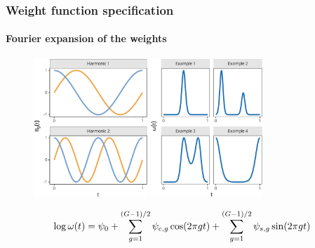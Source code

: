 \documentclass{snedecorbeamer}
\begin{document}
\begin{frame}
  \frametitle{Weight function specification}
  \framesubtitle{Fourier expansion of the weights}

  \begin{figure}
    \centering
    \includegraphics[height=14em]{inc/bew_fourier_basis_wide_fsc070.pdf}
    \includegraphics[height=14em]{inc/bew_fourier_weights_fsc070.pdf}
  \end{figure}
  \begin{equation}
    \tiny
    \log\omega(t)
    \label{eq:few-log}
    =\psi_{0} + \sum_{g=1}^{(G-1)/2}\psi_{c,g} \cos(2\pi g t) +
    \sum_{g=1}^{(G-1)/2}\psi_{s,g} \sin(2\pi g t)
  \end{equation}

\end{frame}
\end{document}
